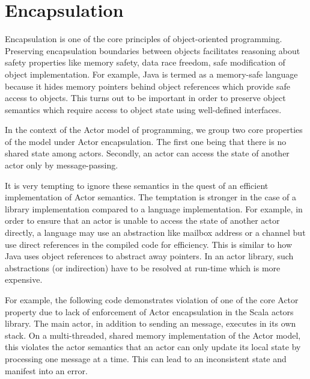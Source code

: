 \section{Encapsulation}
Encapsulation is one of the core principles of object-oriented programming. Preserving encapsulation boundaries between objects facilitates reasoning about safety properties like memory safety, data race freedom, safe modification of object implementation.
For example, Java is termed as a memory-safe language because it hides memory pointers behind object references which provide safe access to objects. This turns out to be important in order to preserve object semantics which require access to object state using well-defined interfaces. %



In the context of the Actor model of programming, we group two core properties of the model under Actor encapsulation. The first one being that there is no shared state among actors. Secondly, an actor can access the state of another actor only by message-passing.

It is very tempting to ignore these semantics in the quest of an efficient implementation of Actor semantics. The temptation is stronger in the case of a library implementation compared to a language implementation. For example, in order to ensure that an actor is unable to access the state of another actor directly, a language may use an abstraction like mailbox address or a channel but use direct references in the compiled code for efficiency. This is similar to how Java uses object references to abstract away pointers. In an actor library, such abstractions (or indirection) have to be resolved at run-time which is more expensive. 

For example, the following code demonstrates violation of one of the core Actor property due to lack of enforcement of Actor encapsulation in the Scala actors library. The main actor, in addition to sending an  message, executes  in its own stack. On a multi-threaded, shared memory implementation of the Actor model, this violates the actor semantics that an actor can only update its local state by processing one message at a time. This can lead to an inconsistent state and manifest into an error.

